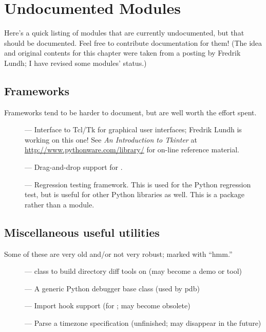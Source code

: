 \chapter{Undocumented Modules}
\label{undoc}

Here's a quick listing of modules that are currently undocumented, but
that should be documented.  Feel free to contribute documentation for
them!  (The idea and original contents for this chapter were taken
from a posting by Fredrik Lundh; I have revised some modules' status.)


\section{Frameworks}

Frameworks tend to be harder to document, but are well worth the
effort spent.

\begin{description}
\item[]
--- Interface to Tcl/Tk for graphical user interfaces;
Fredrik Lundh is working on this one!  See \emph{An Introduction to
Tkinter} at \url{http://www.pythonware.com/library/} for on-line
reference material.

\item[]
--- Drag-and-drop support for .

\item[]
--- Regression testing framework.  This is used for the Python
regression test, but is useful for other Python libraries as well.
This is a package rather than a module.
\end{description}


\section{Miscellaneous useful utilities}

Some of these are very old and/or not very robust; marked with ``hmm.''

\begin{description}
\item[]
--- class to build directory diff tools on (may become a demo or tool)

\item[]
--- A generic Python debugger base class (used by pdb)

\item[]
--- Import hook support (for ; may become obsolete)

\item[]
--- Parse a timezone specification (unfinished; may disappear in the
future)
\end{description}


